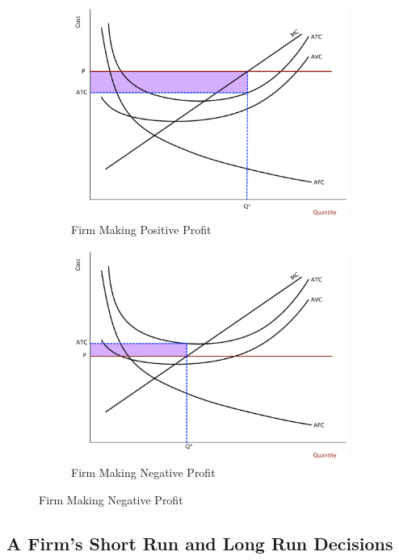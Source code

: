 \documentclass[11pt]{article}\usepackage[]{graphicx}\usepackage[]{color}
\theoremstyle{definition}
\begin{document}
\begin{figure}[H]
	\centering
	\caption{Firm Profits}
	\begin{subfigure}{.5\textwidth}
		\includegraphics[scale=.3]{plot62.pdf}
		\caption{Firm Making Positive Profit}
	\end{subfigure}%
	\begin{subfigure}{.5\textwidth}
		\centering
		\includegraphics[scale=.3]{plot63.pdf}
		\caption{Firm Making Negative Profit}
	\end{subfigure}
\end{figure}

	
	\subsection{A Firm's Short Run and Long Run Decisions}
	
\end{document}
